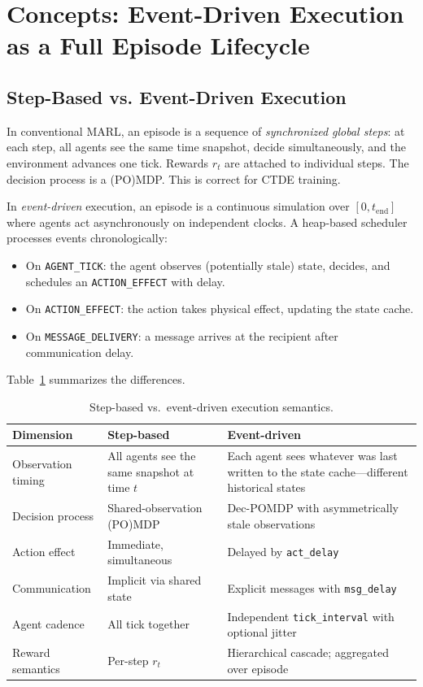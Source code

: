\documentclass{article}
\begin{document}
\section{Concepts: Event-Driven Execution as a Full Episode Lifecycle}
\label{sec:concepts}

\subsection{Step-Based vs. Event-Driven Execution}

In conventional MARL, an episode is a sequence of \emph{synchronized global steps}: at each step, all agents see the same time snapshot, decide simultaneously, and the environment advances one tick. Rewards $r_t$ are attached to individual steps. The decision process is a (PO)MDP. This is correct for CTDE training.

In \emph{event-driven} execution, an episode is a continuous simulation over $[0, t_\text{end}]$ where agents act asynchronously on independent clocks. A heap-based scheduler processes events chronologically:
\begin{itemize}[nosep]
    \item On \texttt{AGENT\_TICK}: the agent observes (potentially stale) state, decides, and schedules an \texttt{ACTION\_EFFECT} with delay.
    \item On \texttt{ACTION\_EFFECT}: the action takes physical effect, updating the state cache.
    \item On \texttt{MESSAGE\_DELIVERY}: a message arrives at the recipient after communication delay.
\end{itemize}

Table~\ref{tab:exec-comparison} summarizes the differences.

\begin{table}[t]
\centering
\caption{Step-based vs.\ event-driven execution semantics.}
\label{tab:exec-comparison}
\small
\begin{tabular}{@{}lp{4.8cm}p{5.2cm}@{}}
\toprule
\textbf{Dimension} & \textbf{Step-based} & \textbf{Event-driven} \\
\midrule
Observation timing & All agents see the same snapshot at time $t$ & Each agent sees whatever was last written to the state cache---different historical states \\
Decision process & Shared-observation (PO)MDP & Dec-POMDP with asymmetrically stale observations \\
Action effect & Immediate, simultaneous & Delayed by \texttt{act\_delay} \\
Communication & Implicit via shared state & Explicit messages with \texttt{msg\_delay} \\
Agent cadence & All tick together & Independent \texttt{tick\_interval} with optional jitter \\
Reward semantics & Per-step $r_t$ & Hierarchical cascade; aggregated over episode \\
\bottomrule
\end{tabular}
\end{table}
\end{document}
